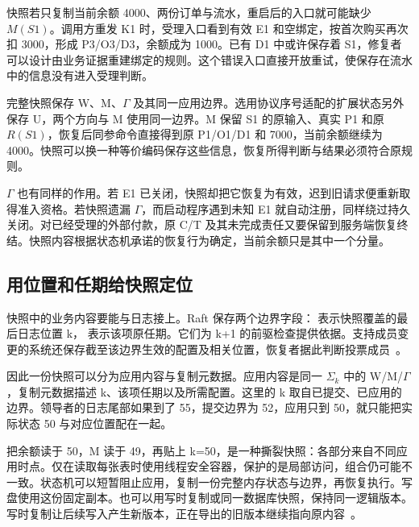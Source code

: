 快照若只复制当前余额 4000、两份订单与流水，重启后的入口就可能缺少 $M(S1)$。调用方重发 K1 时，受理入口看到有效 E1 和空绑定，按首次购买再次扣 3000，形成 P3/O3/D3，余额成为 1000。已有 D1 中或许保存着 S1，修复者可以设计由业务证据重建绑定的规则。这个错误入口直接开放重试，使保存在流水中的信息没有进入受理判断。

完整快照保存 W、M、$\Gamma$ 及其同一应用边界。选用协议序号适配的扩展状态另外保存 U，两个方向与 M 使用同一边界。M 保留 S1 的原输入、真实 P1 和原 $R(S1)$，恢复后同参命令直接得到原 P1/O1/D1 和 7000，当前余额继续为 4000。快照可以换一种等价编码保存这些信息，恢复所得判断与结果必须符合原规则。


$\Gamma$ 也有同样的作用。若 E1 已关闭，快照却把它恢复为有效，迟到旧请求便重新取得准入资格。若快照遗漏 $\Gamma$，而启动程序遇到未知 E1 就自动注册，同样绕过持久关闭。对已经受理的外部付款，原 C/T 及其未完成责任又要保留到服务端恢复终结。快照内容根据状态机承诺的恢复行为确定，当前余额只是其中一个分量。

\subsection*{用位置和任期给快照定位}

快照中的业务内容要能与日志接上。Raft 保存两个边界字段： 表示快照覆盖的最后日志位置 k， 表示该项原任期。它们为 k+1 的前驱检查提供依据。支持成员变更的系统还保存截至该边界生效的配置及相关位置，恢复者据此判断投票成员~\cite{raft}。

因此一份快照可以分为应用内容与复制元数据。应用内容是同一 $\Sigma_k$ 中的 W/M/$\Gamma$，复制元数据描述 k、该项任期以及所需配置。这里的 k 取自已提交、已应用的边界。领导者的日志尾部如果到了 55，提交边界为 52，应用只到 50，就只能把实际状态 50 与对应位置配在一起。


把余额读于 50，M 读于 49，再贴上 k=50，是一种撕裂快照：各部分来自不同应用时点。仅在读取每张表时使用线程安全容器，保护的是局部访问，组合仍可能不一致。状态机可以短暂阻止应用，复制一份完整内存状态与边界，再恢复执行。写盘使用这份固定副本。也可以用写时复制或同一数据库快照，保持同一逻辑版本。写时复制让后续写入产生新版本，正在导出的旧版本继续指向原内容~\cite{raft,ongaro}。

